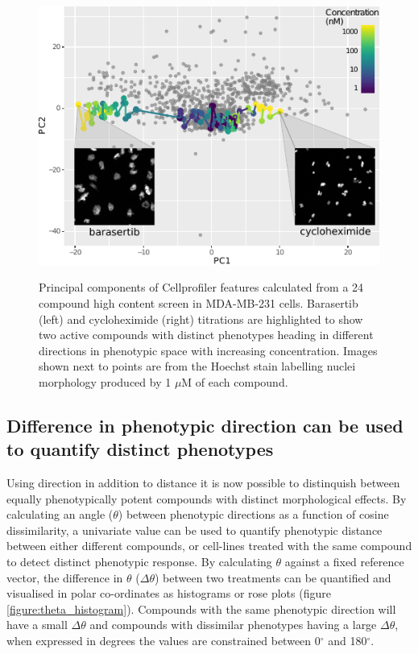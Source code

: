 \documentclass[a4paper,11pt,twoside,openright]{scrbook}
\begin{document}
\begin{figure}
    \captionsetup{width=0.8\textwidth}
    \caption[Two compound titrations highlighted in phenotypic space]{
Principal components of Cellprofiler features calculated from a 24 compound high content screen in MDA-MB-231 cells.
Barasertib (left) and cycloheximide (right) titrations are highlighted to show two active compounds with distinct phenotypes heading in different directions in phenotypic space with increasing concentration.
Images shown next to points are from the Hoechst stain labelling nuclei morphology produced by 1 $\mu$M of each compound.
}
    \includegraphics[scale=1.4]{figs/ch3TCCS_direction}
    \label{figure:pca_direction}
\end{figure}


\subsection{Difference in phenotypic direction can be used to quantify distinct phenotypes}

Using direction in addition to distance it is now possible to distinquish between equally phenotypically potent compounds with distinct morphological effects.
By calculating an angle ($\theta$) between phenotypic directions as a function of cosine dissimilarity, a univariate value can be used to quantify phenotypic distance between either different compounds, or cell-lines treated with the same compound to detect distinct phenotypic response.
By calculating $\theta$ against a fixed reference vector, the difference in $\theta$  ($\Delta\theta$) between two treatments can be quantified and visualised in polar co-ordinates as histograms or rose plots (figure \ref{figure:theta_histogram}).
Compounds with the same phenotypic direction will have a small $\Delta\theta$ and compounds with dissimilar phenotypes having a large $\Delta\theta$, when expressed in degrees the values are constrained between 0$^\circ$ and 180$^\circ$.
\end{document}
